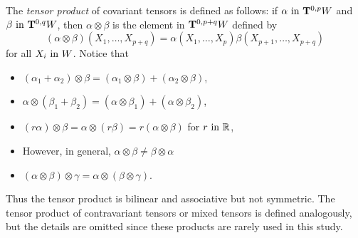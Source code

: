 \documentclass[../main]{subfiles}
\begin{document}
The \emph{tensor product} of covariant tensors is defined as follows: if $\alpha \InText \tensorbundle{W}{0}{ p}$ and $\beta \InText \tensorbundle{W}{0}{ q}$, then $\alpha\otimes \beta$ is the element in $\tensorbundle{W}{0}{ p+q}$ defined by
\[ (\alpha\otimes\beta)(X_1,\dots,X_{p+q}) = \alpha(X_1,\dots,X_p)\beta(X_{p+1},\dots,X_{p+q}) \]
for all $X_i \InText W$. Notice that
\begin{itemize}
    \item $(\alpha_1 + \alpha_2) \otimes \beta = (\alpha_1\otimes\beta) + (\alpha_2\otimes\beta)$,
    \item $\alpha\otimes(\beta_1+\beta_2) = (\alpha\otimes\beta_1) + (\alpha\otimes\beta_2)$,
    \item $(r\alpha)\otimes\beta=\alpha\otimes(r\beta) = r(\alpha\otimes\beta)$ for $r \InText \bR$,
    \item However, in general, $\alpha\otimes\beta\ne\beta\otimes\alpha$
    \item $(\alpha\otimes\beta)\otimes\gamma = \alpha\otimes(\beta\otimes\gamma)$.
\end{itemize}
Thus the tensor product is bilinear and associative but not symmetric. The tensor product of contravariant tensors or mixed tensors is defined analogously, but the details are omitted since these products are rarely used in this study.
\end{document}

